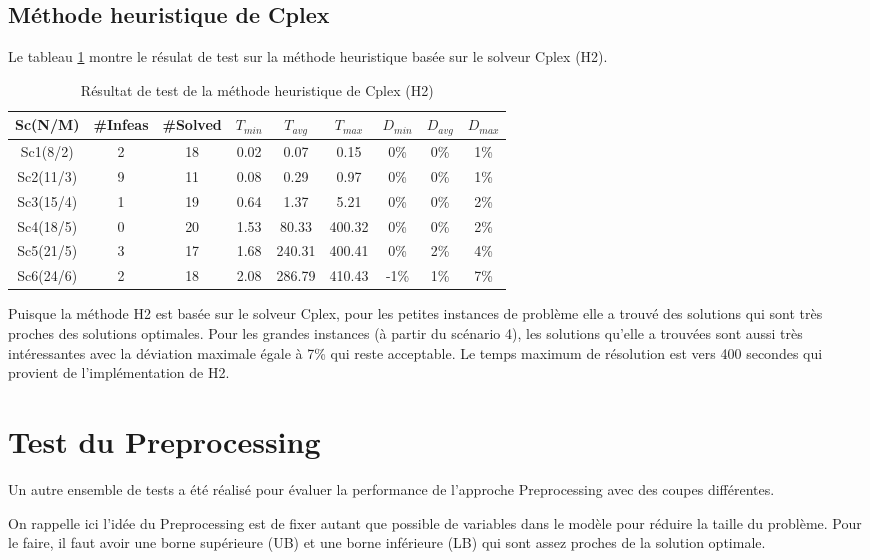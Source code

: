 \documentclass[twoside,fleqn]{EPURapport}
\begin{document}
\section{Méthode heuristique de Cplex}
Le tableau \ref{tab_h2} montre le résulat de test sur la méthode heuristique basée sur le solveur Cplex (H2).


\begin{table}[h]
    \centering
    \begin{tabular}{|c|c|c|c|c|c|c|c|c|}
    	\hline
    	Sc(N/M)	& \#Infeas & \#Solved	& $T_{min}$ & $T_{avg}$	& $T_{max}$ & $D_{min}$ & $D_{avg}$	& $D_{max}$ \\ \hline
		Sc1(8/2)  &2 & 18 &  0.02 &  0.07   &0.15     &0\%  &0\%  &1\% \\ \hline
Sc2(11/3) &9 & 11 &  0.08 &  0.29   &0.97     &0\%  &0\%  &1\% \\ \hline
Sc3(15/4) &1 & 19 &  0.64 &  1.37   &5.21     &0\%  &0\%  &2\% \\ \hline
Sc4(18/5) &0 & 20 &  1.53 &  80.33  & 400.32  &0\%  &0\%  &2\% \\ \hline
Sc5(21/5) &3 & 17 &  1.68 &  240.31 &  400.41 & 0\% & 2\% & 4\% \\ \hline
Sc6(24/6) &2 & 18 &  2.08 &  286.79 &  410.43 & -1\%&  1\%&  7\% \\ \hline
    \end{tabular}
    \label{tab_h2}
    \caption{Résultat de test de la méthode heuristique de Cplex (H2)}
\end{table}
\bigskip


Puisque la méthode H2 est basée sur le solveur Cplex, pour les petites instances de problème elle a trouvé des solutions qui sont très proches des solutions optimales. Pour les grandes instances (à partir du scénario 4), les solutions qu'elle a trouvées sont aussi très intéressantes avec la déviation maximale égale à 7\% qui reste acceptable. Le temps maximum de résolution est vers 400 secondes qui provient de l'implémentation de H2.


\chapter{Test du Preprocessing}
Un autre ensemble de tests a été réalisé pour évaluer la performance de l'approche Preprocessing avec des coupes différentes.

On rappelle ici l'idée du Preprocessing est de fixer autant que possible de variables dans le modèle pour réduire la taille du problème. Pour le faire, il faut avoir une borne supérieure (UB) et une borne inférieure (LB) qui sont assez proches de la solution optimale.
\end{document}
